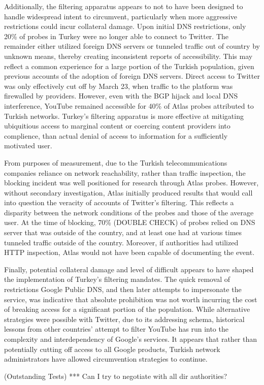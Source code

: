 Additionally, the filtering apparatus appears to not to have been designed to handle widespread intent to circumvent, particularly when more aggressive restrictions could incur collateral damage. Upon initial DNS restrictions, only 20\% of probes in Turkey were no longer able to connect to Twitter. The remainder either utilized foreign DNS servers or tunneled traffic out of country by unknown means, thereby creating inconsistent reports of accessibility. This may reflect a common experience for a large portion of the Turkish population, given previous accounts of the adoption of foreign DNS servers. Direct access to Twitter was only effectively cut off by March 23, when traffic to the platform was firewalled by providers. However, even with the BGP hijack and local DNS interference, YouTube remained accessible for 40\% of Atlas probes attributed to Turkish networks. Turkey's filtering apparatus is more effective at mitigating ubiquitious access to marginal content or coercing content providers into complience, than actual denial of access to information for a sufficiently motivated user.

From purposes of measurement, due to the Turkish telecommunications companies reliance on network reachability, rather than traffic inspection, the blocking incident was well positioned for research through Atlas probes. However, without secondary investigation, Atlas initially produced results that would call into question the veracity of accounts of Twitter's filtering. This reflects a disparity between the network conditions of the probes and those of the average user. At the time of blocking, 70\% (DOUBLE CHECK) of probes relied on DNS server that was outside of the country, and at least one had at various times tunneled traffic outside of the country. Moreover, if authorities had utilized HTTP inspection, Atlas would not have been capable of documenting the event.

Finally, potential collateral damage and level of difficult appears to have shaped the implementation of Turkey's filtering mandates. The quick removal of restrictions Google Public DNS, and then later attempts to impersonate the service, was indicative that absolute prohibition was not worth incurring the cost of breaking access for a significant portion of the population. While alternative strategies were possible with Twitter, due to its addressing schema, historical lessons from other countries' attempt to filter YouTube has run into the complexity and interdependency of Google's services. It appears that rather than potentially cutting off access to all Google products, Turkish network administrators have allowed circumvention strategies to continue.

(Outstanding Tests)
*** Can I try to negotiate with all dir authorities?

